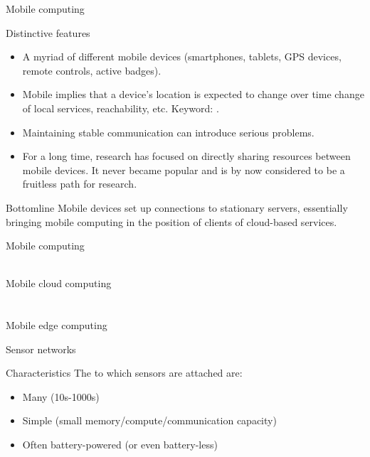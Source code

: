 \begin{slide}{Mobile computing}
  \begin{block}{Distinctive features}
    \begin{itemize}
    \item A myriad of different mobile devices (smartphones, tablets, GPS devices, remote controls, active
      badges).
    \item Mobile implies that a device's location is expected to change over time \mathexpr{\Rightarrow}
      change of local services, reachability, etc. Keyword: .
    \item Maintaining stable communication can introduce serious problems.
    \item For a long time, research has focused on directly sharing resources between mobile devices. It never
      became popular and is by now considered to be a fruitless path for research.
    \end{itemize}
  \end{block}
  \begin{block}{Bottomline}
    Mobile devices set up connections to stationary servers, essentially bringing mobile computing in the
    position of clients of cloud-based services.
  \end{block}
\end{slide}
\begin{slide}{Mobile computing}
  \footnotesize
  \begin{centerfig}
     \\
    Mobile cloud computing \\
    \ \\
     \\
    Mobile edge computing
  \end{centerfig}
\end{slide}
\begin{slide}{Sensor networks}
  \begin{block}{Characteristics}
    The  to which sensors are attached are:
    \begin{itemize}
    \item Many (10s-1000s)
    \item Simple (small memory/compute/communication capacity)
    \item Often battery-powered (or even battery-less)
    \end{itemize}
  \end{block}
\end{slide}
